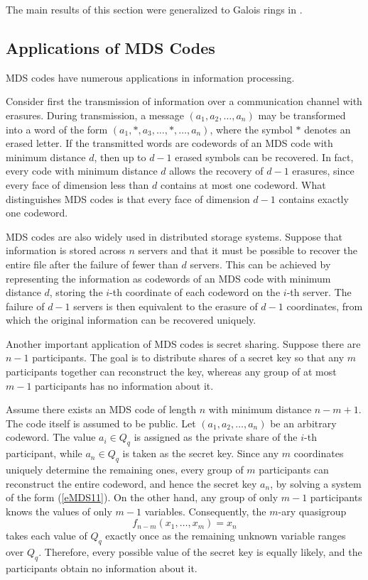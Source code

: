 \documentclass[11pt]{article}
\theoremstyle{definition}
\begin{document}
{{{The main results of this section were generalized to Galois rings in \cite{Dong}.

\subsection{Applications of MDS Codes}

MDS codes have numerous applications in information processing.




Consider first the transmission of information over a communication
channel with erasures. During transmission, a message
$(a_1,a_2,\dots,a_n)$ may be transformed into a word of the form
$(a_1,*,a_3,\dots,*,\dots,a_n)$, where the symbol $*$ denotes an erased
letter. If the transmitted words are codewords of an MDS code with
minimum distance $d$, then up to $d-1$ erased symbols can be recovered.
In fact, every code with minimum distance $d$ allows the recovery of
$d-1$ erasures, since every face of dimension less than $d$ contains at
most one codeword. What distinguishes MDS codes is that every face of
dimension $d-1$ contains exactly one codeword.

MDS codes are also widely used in distributed storage systems. Suppose
that information is stored across $n$ servers and that it must be
possible to recover the entire file after the failure of fewer than
$d$ servers. This can be achieved by representing the information as
codewords of an MDS code with minimum distance $d$, storing the
$i$-th coordinate of each codeword on the $i$-th server. The failure
of $d-1$ servers is then equivalent to the erasure of $d-1$
coordinates, from which the original information can be recovered
uniquely.

Another important application of MDS codes is secret sharing. Suppose
there are $n-1$ participants. The goal is to distribute shares of a
secret key so that any $m$ participants together can reconstruct the
key, whereas any group of at most $m-1$ participants has no
information  about it.

Assume there exists an MDS code of length $n$ with minimum distance
$n-m+1$. The code itself is assumed to be public. Let
$(a_1,a_2,\dots,a_n)$ be an arbitrary codeword. The value
$a_i\in Q_q$ is assigned as the private share of the $i$-th
participant, while $a_n\in Q_q$ is taken as the secret key. Since any
$m$ coordinates uniquely determine the remaining ones, every group of
$m$ participants can reconstruct the entire codeword, and hence the
secret key $a_n$, by solving a system of the form
(\ref{eMDS11}). On the other hand, any group of only $m-1$
participants knows the values of only $m-1$ variables. Consequently,
the $m$-ary quasigroup
\[
f_{n-m}(x_1,\dots,x_m)=x_n
\]
takes each value of $Q_q$ exactly once as the remaining unknown
variable ranges over $Q_q$. Therefore, every possible value of the
secret key is equally likely, and the participants obtain no
information about it.


}}}
\end{document}
